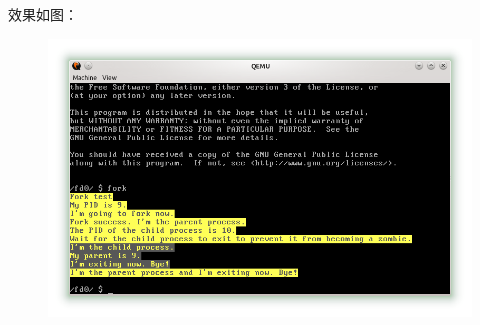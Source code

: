 \documentclass[a4paper, adobefonts]{ctexart}
\begin{document}
效果如图：

\begin{figure}[htp!]
    \center\includegraphics[scale=0.72]{fork_test.png}
\end{figure}
\end{document}
